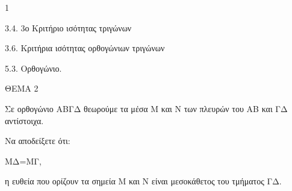 \begin{ylh}{1}
    \item 3.4. 3ο Κριτήριο ισότητας τριγώνων
    \item 3.6. Κριτήρια ισότητας ορθογώνιων τριγώνων
    \item 5.3. Ορθογώνιο.
\end{ylh}

ΘΕΜΑ 2

Σε ορθογώνιο ΑΒΓΔ θεωρούμε τα μέσα Μ και Ν των πλευρών του ΑΒ και ΓΔ αντίστοιχα.

Να αποδείξετε ότι:

\begin{alist}
\item ΜΔ=ΜΓ, 

\item η ευθεία που ορίζουν τα σημεία Μ και Ν είναι μεσοκάθετος του τμήματος ΓΔ.

\end{alist}
